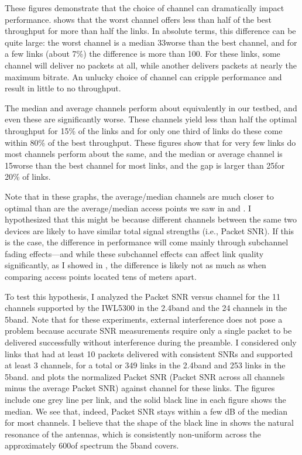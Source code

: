 These figures demonstrate that the choice of channel can dramatically impact performance.  shows that the worst channel offers less than half of the best throughput for more than half the links. In absolute terms, this difference can be quite large: the worst channel is a median 33\Mbps worse than the best channel, and for a few links (about 7\%) the difference is more than 100\Mbps. For these links, some channel will deliver no packets at all, while another delivers packets at nearly the maximum bitrate. An unlucky choice of channel can cripple performance and result in little to no throughput.

The median and average channels perform about equivalently in our testbed, and even these are significantly worse. These channels yield less than half the optimal throughput for 15\% of the links and for only one third of links do these come within 80\% of the best throughput. These figures show that for very few links do most channels perform about the same, and the median or average channel is 15\Mbps worse than the best channel for most links, and the gap is larger than 25\Mbps for 20\% of links.

Note that in these graphs, the average/median channels are much closer to optimal than are the average/median access points we saw in  and . I hypothesized that this might be because different channels between the same two devices are likely to have similar total signal strengths (i.e., Packet SNR). If this is the case, the difference in performance will come mainly through subchannel fading effects---and while these subchannel effects can affect link quality significantly, as I showed in , the difference is likely not as much as when comparing access points located tens of meters apart.

To test this hypothesis, I analyzed the Packet SNR versus channel for the 11 channels supported by the IWL5300 in the 2.4\GHz band and the 24 channels in the 5\GHz band. Note that for these experiments, external interference does not pose a problem because accurate SNR measurements require only a single packet to be delivered successfully without interference during the preamble. I considered only links that had at least 10 packets delivered with consistent SNRs and supported at least 3 channels, for a total or 349 links in the 2.4\GHz band and 253 links in the 5\GHz band.  and  plots the normalized Packet SNR (Packet SNR across all channels minus the average Packet SNR) against channel for these links. The figures include one grey line per link, and the solid black line in each figure shows the median. We see that, indeed, Packet SNR stays within a few dB of the median for most channels. I believe that the shape of the black line in  shows the natural resonance of the antennas, which is consistently non-uniform across the approximately 600\MHz of spectrum the 5\GHz band covers.

